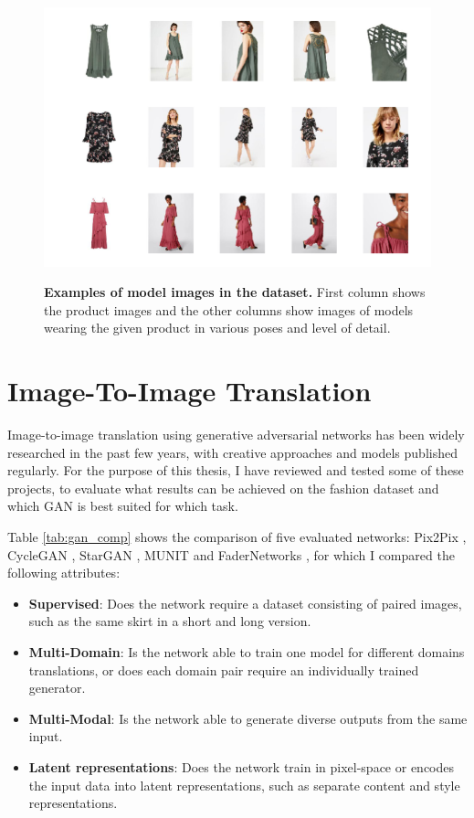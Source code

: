 \documentclass[12pt]{report}
\begin{document}
\begin{figure}[h]
\centering
{\includegraphics[width=\linewidth]{03_analysis/data/model_images}}
\caption{\label{fig:models} \textbf{Examples of model images in the dataset.} First column shows the product images and the other columns show images of models wearing the given product in various poses and level of detail.}
\end{figure}

\pagebreak
\section{Image-To-Image Translation}
Image-to-image translation using generative adversarial networks has been widely researched in the past few years, with creative approaches and models published regularly. For the purpose of this thesis, I have reviewed and tested some of these projects, to evaluate what results can be achieved on the fashion dataset and which GAN is best suited for which task.

Table \ref{tab:gan_comp} shows the comparison of five evaluated networks: Pix2Pix \cite{isola_image--image_2016}, CycleGAN \cite{zhu_unpaired_2017}, StarGAN \cite{choi_stargan_2017}, MUNIT \cite{huang_multimodal_2018} and FaderNetworks \cite{lample_fader_2017}, for which I compared the following attributes:
\begin{itemize}
\item \textbf{Supervised}: Does the network require a dataset consisting of paired images, such as the same skirt in a short and long version.
\item \textbf{Multi-Domain}: Is the network able to train one model for different domains translations, or does each domain pair require an individually trained generator.
\item \textbf{Multi-Modal}: Is the network able to generate diverse outputs from the same input.
\item \textbf{Latent representations}: Does the network train in pixel-space or encodes the input data into latent representations, such as separate content and style representations.
\end{itemize}
\end{document}
